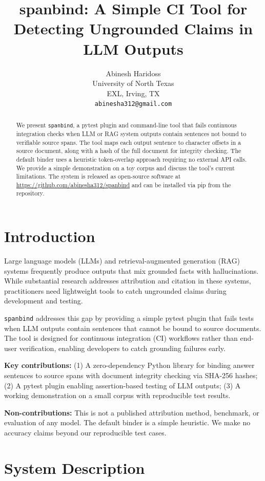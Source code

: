 \documentclass{article}
\title{spanbind: A Simple CI Tool for Detecting Ungrounded Claims in LLM Outputs}
\author{
  Abinesh Haridoss \\
  University of North Texas \\
  EXL, Irving, TX \\
  \texttt{abinesha312@gmail.com}
}
\begin{document}
\maketitle

\begin{abstract}
We present \texttt{spanbind}, a pytest plugin and command-line tool that fails continuous integration checks when LLM or RAG system outputs contain sentences not bound to verifiable source spans. The tool maps each output sentence to character offsets in a source document, along with a hash of the full document for integrity checking. The default binder uses a heuristic token-overlap approach requiring no external API calls. We provide a simple demonstration on a toy corpus and discuss the tool's current limitations. The system is released as open-source software at \url{https://github.com/abinesha312/spanbind} and can be installed via pip from the repository.
\end{abstract}

\section{Introduction}

Large language models (LLMs) and retrieval-augmented generation (RAG) systems frequently produce outputs that mix grounded facts with hallucinations. While substantial research addresses attribution and citation in these systems, practitioners need lightweight tools to catch ungrounded claims during development and testing.

\texttt{spanbind} addresses this gap by providing a simple pytest plugin that fails tests when LLM outputs contain sentences that cannot be bound to source documents. The tool is designed for continuous integration (CI) workflows rather than end-user verification, enabling developers to catch grounding failures early.

\textbf{Key contributions:} (1) A zero-dependency Python library for binding answer sentences to source spans with document integrity checking via SHA-256 hashes; (2) A pytest plugin enabling assertion-based testing of LLM outputs; (3) A working demonstration on a small corpus with reproducible test results.

\textbf{Non-contributions:} This is not a published attribution method, benchmark, or evaluation of any model. The default binder is a simple heuristic. We make no accuracy claims beyond our reproducible test cases.

\section{System Description}
\end{document}
